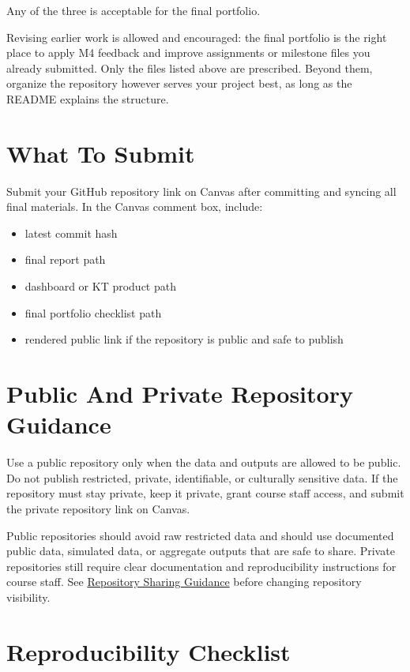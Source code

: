 \documentclass[
  letterpaper,
  DIV=11,
  numbers=noendperiod,
  oneside]{scrreprt}
\providecommand{\tightlist}{%
  \setlength{\itemsep}{0pt}\setlength{\parskip}{0pt}}
\begin{document}
Any of the three is acceptable for the final portfolio.

Revising earlier work is allowed and encouraged: the final portfolio is
the right place to apply M4 feedback and improve assignments or
milestone files you already submitted. Only the files listed above are
prescribed. Beyond them, organize the repository however serves your
project best, as long as the README explains the structure.

\section{What To Submit}\label{what-to-submit-16}

Submit your GitHub repository link on Canvas after committing and
syncing all final materials. In the Canvas comment box, include:

\begin{itemize}
\tightlist
\item
  latest commit hash
\item
  final report path
\item
  dashboard or KT product path
\item
  final portfolio checklist path
\item
  rendered public link if the repository is public and safe to publish
\end{itemize}

\section{Public And Private Repository
Guidance}\label{public-and-private-repository-guidance}

Use a public repository only when the data and outputs are allowed to be
public. Do not publish restricted, private, identifiable, or culturally
sensitive data. If the repository must stay private, keep it private,
grant course staff access, and submit the private repository link on
Canvas.

Public repositories should avoid raw restricted data and should use
documented public data, simulated data, or aggregate outputs that are
safe to share. Private repositories still require clear documentation
and reproducibility instructions for course staff. See
\href{repository-sharing-guidance.md}{Repository Sharing Guidance}
before changing repository visibility.

\section{Reproducibility Checklist}\label{reproducibility-checklist}
\end{document}
